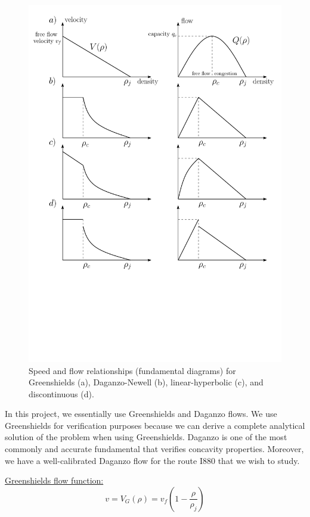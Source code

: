 \documentclass[letterpaper,10pt]{article}
\begin{document}
\begin{figure}
\centering
\includegraphics[width=12cm]{fundamentalDiagram.pdf}
    \caption[Common Fundamental Diagrams]{Speed and flow relationships (fundamental diagrams) for Greenshields (a), Daganzo-Newell (b), linear-hyperbolic (c), and discontinuous (d).}
\label{fig:fundamentalDiagram}
\end{figure}

\bigskip
In this project, we essentially use Greenshields and Daganzo flows. We use Greenshields for verification purposes because we can derive a complete analytical solution of the problem when using Greenshields. Daganzo is one of the most commonly and accurate fundamental that verifies concavity properties. Moreover, we have a well-calibrated Daganzo flow for the route I880 that we wish to study.

\bigskip
\noindent\underline{Greenshields flow function:} 
\begin{equation} \label{eq:greenshieldsVelocity}
v = V_{G}(\rho) = v_{f}(1-\frac{\rho}{\rho_{j}})
\end{equation}
\end{document}
